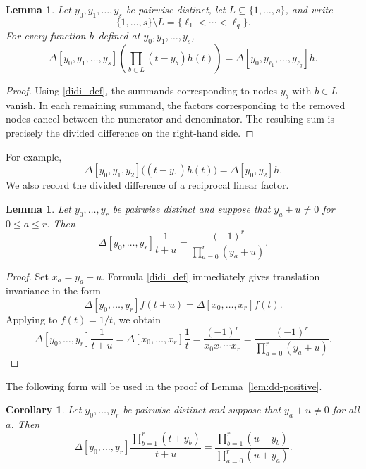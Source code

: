 \documentclass[12pt]{amsart}
\newtheorem{Lemma}[Theorem]{Lemma}
\newtheorem{Corollary}[Theorem]{Corollary}
\theoremstyle{definition}
\newcommand{\DD}{\Delta}
\begin{document}
\begin{Lemma}\label{lem:node-removal}
Let $y_0,y_1,\ldots,y_s$ be pairwise distinct, let
$L\subseteq\{1,\ldots,s\}$, and write
\[
\{1,\ldots,s\}\setminus L=\{\ell_1<\cdots<\ell_q\}.
\]
For every function $h$ defined at $y_0,y_1,\ldots,y_s$,
\[
\DD[y_0,y_1,\ldots,y_s]
\left(
\prod_{b\in L}(t-y_b)h(t)
\right)
=
\DD[y_0,y_{\ell_1},\ldots,y_{\ell_q}]h.
\]
\end{Lemma}

\begin{proof}
Using \eqref{didi_def}, the summands corresponding to nodes $y_b$
with $b\in L$ vanish.
In each remaining summand, the factors corresponding to the removed
nodes cancel between the numerator and denominator.
The resulting sum is precisely the divided difference on the
right-hand side.
\end{proof}

For example,
\[
\DD[y_0,y_1,y_2]\bigl((t-y_1)h(t)\bigr)
=
\DD[y_0,y_2]h.
\]
We also record the divided difference of a reciprocal linear factor.

\begin{Lemma}\label{lem:reciprocal-dd}
Let $y_0,\ldots,y_r$ be pairwise distinct and suppose that
$y_a+u\ne0$ for $0\le a\le r$.  Then
\begin{equation}\label{t+u}
\DD[y_0,\ldots,y_r]\frac1{t+u}
=
\frac{(-1)^r}{\prod_{a=0}^r(y_a+u)}.
\end{equation}
\end{Lemma}

\begin{proof}
Set $x_a=y_a+u$.  Formula \eqref{didi_def} immediately gives translation invariance in
the form
\[
\DD[y_0,\ldots,y_r]f(t+u)
=
\DD[x_0,\ldots,x_r]f(t).
\]
Applying \cite[Theorem~13]{DubeauHermite} to $f(t)=1/t$, we obtain
\[
\DD[y_0,\ldots,y_r]\frac1{t+u}
=
\DD[x_0,\ldots,x_r]\frac1t
=
\frac{(-1)^r}{x_0x_1\cdots x_r}
=
\frac{(-1)^r}{\prod_{a=0}^r(y_a+u)}.
\]
\end{proof}

The following form will be used in the proof of Lemma~\ref{lem:dd-positive}.

\begin{Corollary}\label{cor:rational-dd}
Let $y_0,\ldots,y_r$ be pairwise distinct and suppose that $y_a+u\ne0$
for all $a$.  Then
\[
\DD[y_0,\ldots,y_r]
\frac{\prod_{b=1}^r(t+y_b)}{t+u}
=
\frac{\prod_{b=1}^r(u-y_b)}{\prod_{a=0}^r(u+y_a)}.
\]
\end{Corollary}
\end{document}
